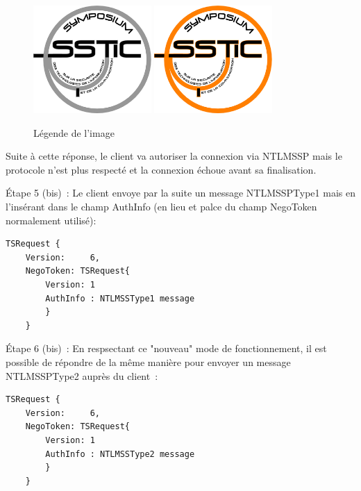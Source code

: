 \begin{figure}[ht]
  \centering
  \ifssticbw
    \includegraphics[width=0.4\textwidth]{AnalyseRDP/img/bw-archi}
  \else
    \includegraphics[width=0.4\textwidth]{AnalyseRDP/img/archi}
  \fi
  \caption{L\'egende de l'image}
  \label{fig:AnalyseRDP:archi}
\end{figure}


Suite à cette r\'eponse, le client va autoriser la connexion via NTLMSSP mais le protocole n'est plus respecté et la connexion échoue avant sa finalisation.

Étape 5 (bis) :
Le client envoye par la suite un message NTLMSSPType1 mais en l'ins\'erant dans le champ AuthInfo (en lieu et palce du champ NegoToken normalement utilisé):

\begin{lstlisting}[frame=single,basicstyle=\tiny]
TSRequest {
	Version:     6,
	NegoToken: TSRequest{
		Version: 1
		AuthInfo : NTLMSSType1 message
		}
	}
\end{lstlisting}


Étape 6 (bis) :
En respsectant ce "nouveau" mode de fonctionnement, il est possible de r\'epondre de la même manière pour envoyer un message NTLMSSPType2 auprès du client :

\begin{lstlisting}[frame=single,basicstyle=\tiny]
TSRequest {
	Version:     6,
	NegoToken: TSRequest{
		Version: 1
		AuthInfo : NTLMSSType2 message
		}
	}
\end{lstlisting}


